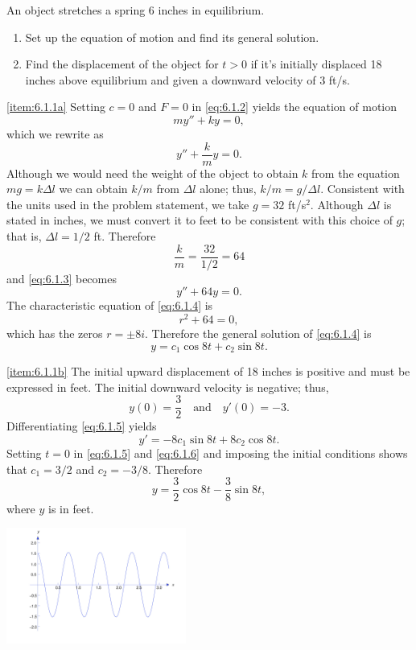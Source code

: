 \documentclass{ximera}
\begin{document}
\begin{example}\label{example:6.1.1}
An object stretches a spring 6 inches in equilibrium.
\begin{enumerate}
\item \label{item:6.1.1a} %
Set up the equation of motion and find its general solution.
 
\item \label{item:6.1.1b} %
Find the displacement of the object for $t>0$ if it's initially
displaced 18 inches above equilibrium and given a downward velocity of
3 ft/s.
\end{enumerate}
 
 
\begin{explanation}
\ref{item:6.1.1a}
Setting $c=0$ and $F=0$ in \eqref{eq:6.1.2} yields the equation of motion
$$
my''+ky=0,
$$
which we rewrite as
\begin{equation}\label{eq:6.1.3}
y''+\frac{k}{m}y=0.
\end{equation}
Although we would need the weight of the object to obtain $k$ from the
equation $mg=k\Delta l$ we can obtain $k/m$ from $\Delta l$ alone;
thus, $k/m=g/\Delta l$. Consistent with the units used in the problem
statement, we take $g=32$ ft/s$^2$. Although $\Delta l$ is stated in
inches, we must convert it to feet to be consistent with this choice
of $g$; that is, $\Delta l =1/2$ ft. Therefore
$$
\frac{k}{m}=\frac{32}{1/2}=64
$$
and \eqref{eq:6.1.3} becomes
\begin{equation}\label{eq:6.1.4}
y''+64y=0.
\end{equation}
 The characteristic equation of \eqref{eq:6.1.4} is
$$
r^2+64=0,
$$
which has the zeros $r=\pm 8i$. Therefore the general solution of
\eqref{eq:6.1.4} is
\begin{equation}\label{eq:6.1.5}
y=c_1\cos8t+c_2\sin8t.
\end{equation}
 
\ref{item:6.1.1b}
The initial upward displacement of 18 inches is positive and must be
expressed in feet. The initial downward velocity is negative;   thus,
$$
y(0)=\frac{3}{2}\quad\mbox{and}\quad y'(0)=-3.
$$
 Differentiating \eqref{eq:6.1.5} yields
\begin{equation}\label{eq:6.1.6}
y'=-8c_1\sin8t+8c_2\cos8t.
\end{equation}
Setting $t=0$ in \eqref{eq:6.1.5} and \eqref{eq:6.1.6} and imposing the
initial conditions shows that $c_1=3/2$ and $c_2=-3/8$. Therefore
$$
y=\frac{3}{2}\cos8t-\frac{3}{8}\sin8t,
$$
where $y$ is in feet.
 
\begin{image}
  \includegraphics[height=1.5in]{fig060104.jpg}
\end{image}
\end{explanation}
\end{example}
 
\end{document}

